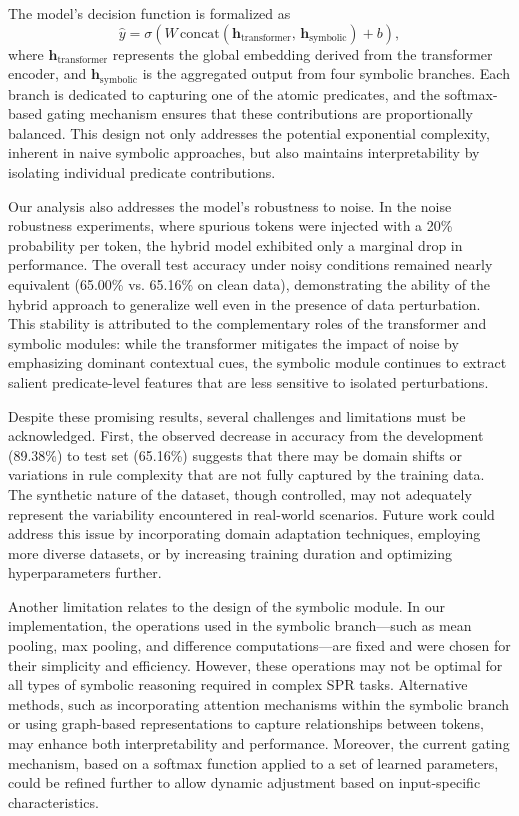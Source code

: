 \documentclass{article}
\begin{document}
The model’s decision function is formalized as
\[
\hat{y} = \sigma\left(W\,\mathrm{concat}\left(\mathbf{h}_{\text{transformer}},\, \mathbf{h}_{\text{symbolic}}\right) + b\right),
\]
where \(\mathbf{h}_{\text{transformer}}\) represents the global embedding derived from the transformer encoder, and \(\mathbf{h}_{\text{symbolic}}\) is the aggregated output from four symbolic branches. Each branch is dedicated to capturing one of the atomic predicates, and the softmax-based gating mechanism ensures that these contributions are proportionally balanced. This design not only addresses the potential exponential complexity, inherent in naive symbolic approaches, but also maintains interpretability by isolating individual predicate contributions.

Our analysis also addresses the model’s robustness to noise. In the noise robustness experiments, where spurious tokens were injected with a 20\% probability per token, the hybrid model exhibited only a marginal drop in performance. The overall test accuracy under noisy conditions remained nearly equivalent (65.00\% vs. 65.16\% on clean data), demonstrating the ability of the hybrid approach to generalize well even in the presence of data perturbation. This stability is attributed to the complementary roles of the transformer and symbolic modules: while the transformer mitigates the impact of noise by emphasizing dominant contextual cues, the symbolic module continues to extract salient predicate-level features that are less sensitive to isolated perturbations.

Despite these promising results, several challenges and limitations must be acknowledged. First, the observed decrease in accuracy from the development (89.38\%) to test set (65.16\%) suggests that there may be domain shifts or variations in rule complexity that are not fully captured by the training data. The synthetic nature of the dataset, though controlled, may not adequately represent the variability encountered in real-world scenarios. Future work could address this issue by incorporating domain adaptation techniques, employing more diverse datasets, or by increasing training duration and optimizing hyperparameters further.

Another limitation relates to the design of the symbolic module. In our implementation, the operations used in the symbolic branch—such as mean pooling, max pooling, and difference computations—are fixed and were chosen for their simplicity and efficiency. However, these operations may not be optimal for all types of symbolic reasoning required in complex SPR tasks. Alternative methods, such as incorporating attention mechanisms within the symbolic branch or using graph-based representations to capture relationships between tokens, may enhance both interpretability and performance. Moreover, the current gating mechanism, based on a softmax function applied to a set of learned parameters, could be refined further to allow dynamic adjustment based on input-specific characteristics.
\end{document}
